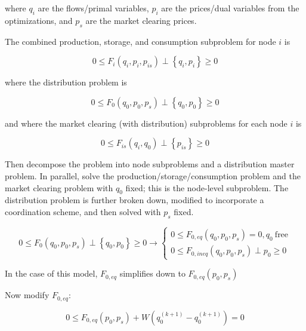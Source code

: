 \documentclass[letter,12pt]{article}
\begin{document}
\noindent where $q_i$ are the flows/primal variables, $p_i$ are the prices/dual variables from the optimizations, and $p_s$ are the market clearing prices.

The combined production, storage, and consumption subproblem for node $i$ is

\begin{equation}
0 \leq F_i \left(q_i, p_i, p_{is}\right) \perp \left\{q_i, p_i\right\} \geq 0
\end{equation}

\noindent where the distribution problem is

\begin{equation}
0 \leq F_0 \left(q_0, p_0, p_s\right) \perp \left\{q_0, p_0\right\} \geq 0
\end{equation}

\noindent and where the market clearing (with distribution) subproblems for each node $i$ is 

\begin{equation}
0 \leq F_{is} \left(q_i, q_0 \right) \perp \left\{p_{is}\right\} \geq 0
\end{equation}

Then decompose the problem into node subproblems and a distribution master problem.  In parallel, solve the production/storage/consumption problem and the market clearing problem with $q_0$ fixed; this is the node-level subproblem.  The distribution problem is further broken down, modified to incorporate a coordination scheme, and then solved with $p_s$ fixed.

\begin{equation}
0 \leq F_0 \left(q_0, p_0, p_s\right) \perp \left\{q_0, p_0\right\} \geq 0 \rightarrow \left\{\begin{array}{c}
0 \leq F_{0,eq} \left(q_0, p_0, p_s\right) = 0 , q_0 \ \text{free} \\
0 \leq F_{0,ineq} \left(q_0, p_0, p_s\right) \perp p_0 \geq 0
\end{array} \right.
\end{equation}

In the case of this model, $F_{0,eq}$ simplifies down to $F_{0,eq} \left(p_0, p_s\right)$

Now modify $F_{0,eq}$:

\begin{equation}
0 \leq F_{0,eq} \left(p_0, p_s\right) + W \left(q_0^{\left(k+1\right)} - q_0^{\left(k+1\right)}\right) = 0
\end{equation}
\end{document}
